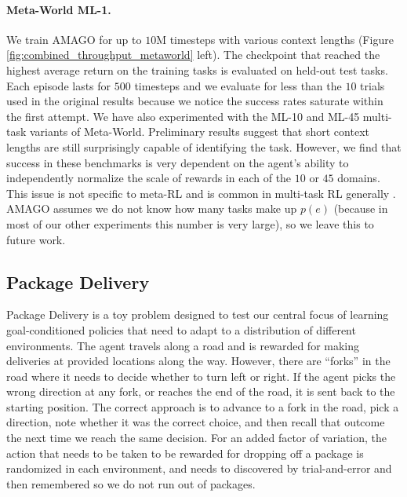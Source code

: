 \documentclass{article}
\begin{document}
\paragraph{Meta-World ML-1.} We train AMAGO for up to $10$M timesteps with various context lengths (Figure \ref{fig:combined_throughput_metaworld} left). The checkpoint that reached the highest average return on the training tasks is evaluated on held-out test tasks. Each episode lasts for $500$ timesteps and we evaluate for less than the $10$ trials used in the original results \cite{yu2020meta} because we notice the success rates saturate within the first attempt. We have also experimented with the ML-10 and ML-45 multi-task variants of Meta-World. Preliminary results suggest that short context lengths are still surprisingly capable of identifying the task. However, we find that success in these benchmarks is very dependent on the agent's ability to independently normalize the scale of rewards in each of the $10$ or $45$ domains. This issue is not specific to meta-RL and is common in multi-task RL generally \cite{van2016learning, kurin2022defense}. AMAGO assumes we do not know how many tasks make up $p(e)$ (because in most of our other experiments this number is very large), so we leave this to future work.
\subsection{Package Delivery}
\label{app:experiment_details:package}
Package Delivery is a toy problem designed to test our central focus of learning goal-conditioned policies that need to adapt to a distribution of different environments. The agent travels along a road and is rewarded for making deliveries at provided locations along the way. However, there are ``forks'' in the road where it needs to decide whether to turn left or right. If the agent picks the wrong direction at any fork, or reaches the end of the road, it is sent back to the starting position. The correct approach is to advance to a fork in the road, pick a direction, note whether it was the correct choice, and then recall that outcome the next time we reach the same decision. For an added factor of variation, the action that needs to be taken to be rewarded for dropping off a package is randomized in each environment, and needs to discovered by trial-and-error and then remembered so we do not run out of packages.
\end{document}
